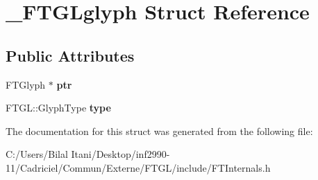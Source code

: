 \hypertarget{struct___f_t_g_lglyph}{}\section{\+\_\+\+F\+T\+G\+Lglyph Struct Reference}
\label{struct___f_t_g_lglyph}
\subsection*{Public Attributes}
\begin{DoxyCompactItemize}
\item 
F\+T\+Glyph $\ast$ {\bfseries ptr}\hypertarget{struct___f_t_g_lglyph_a6bd6880c871ebdc4f78f15f698e8421b}{}\label{struct___f_t_g_lglyph_a6bd6880c871ebdc4f78f15f698e8421b}

\item 
F\+T\+G\+L\+::\+Glyph\+Type {\bfseries type}\hypertarget{struct___f_t_g_lglyph_aa5d5991a60bfba8ee2a8f850553675b8}{}\label{struct___f_t_g_lglyph_aa5d5991a60bfba8ee2a8f850553675b8}

\end{DoxyCompactItemize}


The documentation for this struct was generated from the following file\+:\begin{DoxyCompactItemize}
\item 
C\+:/\+Users/\+Bilal Itani/\+Desktop/inf2990-\/11/\+Cadriciel/\+Commun/\+Externe/\+F\+T\+G\+L/include/F\+T\+Internals.\+h\end{DoxyCompactItemize}
